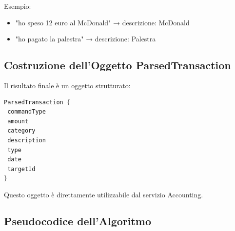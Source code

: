 Esempio:

\begin{itemize}
    \item "ho speso 12 euro al McDonald"
          → descrizione: McDonald

    \item "ho pagato la palestra"
          → descrizione: Palestra
\end{itemize}

\subsection{Costruzione dell'Oggetto ParsedTransaction}

Il risultato finale è un oggetto strutturato:

\bigskip

\begin{lstlisting}[language=Java]
ParsedTransaction {
 commandType
 amount
 category
 description
 type
 date
 targetId
}
\end{lstlisting}

Questo oggetto è direttamente utilizzabile dal servizio Accounting.

\subsection{Pseudocodice dell'Algoritmo}

